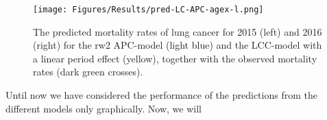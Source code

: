 \begin{figure}[h!]
    \centering
    \texttt{[image: Figures/Results/pred-LC-APC-agex-l.png]}
    \caption{The predicted mortality rates of lung cancer for 2015 (left) and 2016 (right) for the rw2 APC-model (light blue) and the LCC-model with a linear period effect (yellow), together with the observed mortality rates (dark green crosses).}
    \label{fig:APC-LC-compare-l}
\end{figure}

Until now we have considered the performance of the predictions from the different models only graphically. Now, we will 